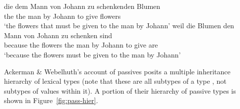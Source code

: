 \documentclass[output=paper
 	        ,biblatex
                ,babelshorthands
                ,newtxmath
                ,draftmode
                ,colorlinks, citecolor=brown
]{langscibook}
\begin{document}
\begin{exe}
	\ex\label{zu-pass}
	\begin{xlist}
		\ex\label{zu-pass-a}
		\gll die dem Mann von Johann zu schenkenden Blumen \\
		the the man by Johann to give flowers  \\
		\glt `the flowers that must be given to the man by Johann'
		\ex\label{zu-pass-b}
		\gll weil die Blumen den Mann von Johann zu schenken sind \\
		because the flowers the man by Johann to give are \\
		\glt `because the flowers must be given to the man by Johann'
	\end{xlist}
\end{exe}

Ackerman \& Webelhuth's account of  passives posits a multiple inheritance hierarchy of lexical types (note that these are all subtypes of a type , not subtypes of values within it). A portion of their hierarchy of  passive types is shown in Figure~\ref{fig:pass-hier}.
\end{document}
